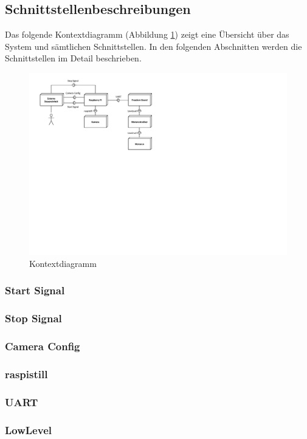 \subsection{Schnittstellenbeschreibungen}
Das folgende Kontextdiagramm (Abbildung \ref{fig:kontextdiagramm}) zeigt eine Übersicht über das System und sämtlichen Schnittstellen. In den folgenden Abschnitten werden die Schnittstellen im Detail beschrieben.

\begin{figure}[h!]
	\centering
	\includegraphics[width=0.9\linewidth]{../../fig/kontextdiagramm}
	\caption{Kontextdiagramm}
	\label{fig:kontextdiagramm}
\end{figure}

\subsubsection{Start Signal}


\subsubsection{Stop Signal}


\subsubsection{Camera Config}


\subsubsection{raspistill}


\subsubsection{UART}


\subsubsection{LowLevel}



